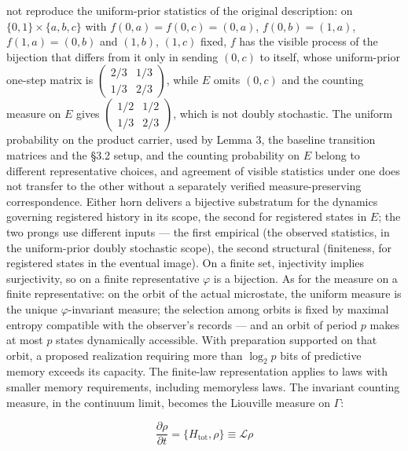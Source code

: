 \documentclass[
]{article}
\begin{document}
not reproduce the uniform-prior statistics of the original description:
on \(\{0,1\} \times \{a,b,c\}\) with \(f(0,a) = f(0,c) = (0,a)\),
\(f(0,b) = (1,a)\), \(f(1,a) = (0,b)\) and \((1,b)\), \((1,c)\) fixed,
\(f\) has the visible process of the bijection that differs from it only
in sending \((0,c)\) to itself, whose uniform-prior one-step matrix is
\(\left(\begin{smallmatrix} 2/3 & 1/3 \\ 1/3 & 2/3 \end{smallmatrix}\right)\),
while \(E\) omits \((0,c)\) and the counting measure on \(E\) gives
\(\left(\begin{smallmatrix} 1/2 & 1/2 \\ 1/3 & 2/3 \end{smallmatrix}\right)\),
which is not doubly stochastic. The uniform probability on the product
carrier, used by Lemma 3, the baseline transition matrices and the §3.2
setup, and the counting probability on \(E\) belong to different
representative choices, and agreement of visible statistics under one
does not transfer to the other without a separately verified
measure-preserving correspondence. Either horn delivers a bijective
substratum for the dynamics governing registered history in its scope,
the second for registered states in \(E\); the two prongs use different
inputs --- the first empirical (the observed statistics, in the
uniform-prior doubly stochastic scope), the second structural
(finiteness, for registered states in the eventual image). On a finite
set, injectivity implies surjectivity, so on a finite representative
\(\varphi\) is a bijection. As for the measure on a finite
representative: on the orbit of the actual microstate, the uniform
measure is the unique \(\varphi\)-invariant measure; the selection among
orbits is fixed by maximal entropy compatible with the observer's
records --- and an orbit of period \(p\) makes at most \(p\) states
dynamically accessible. With preparation supported on that orbit, a
proposed realization requiring more than \(\log_2 p\) bits of predictive
memory exceeds its capacity. The finite-law representation applies to
laws with smaller memory requirements, including memoryless laws. The
invariant counting measure, in the continuum limit, becomes the
Liouville measure on \(\Gamma\):

\[\frac{\partial \rho}{\partial t} = \{H_{\text{tot}}, \rho\} \equiv \mathcal{L}\rho\]
\end{document}

